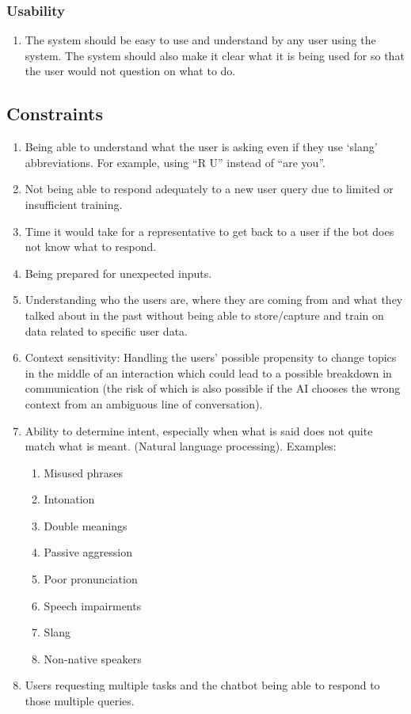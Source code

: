 \documentclass[11pt]{article}
\begin{document}
\subsubsection{Usability}
\begin{enumerate}
	\item The system should be easy to use and understand by any user using the system.  The system should also make it clear what it is being used for so that the user would not question on what to do.
\end{enumerate}

\subsection{Constraints}
\begin{enumerate}
	\item Being able to understand what the user is asking even if they use ‘slang’ abbreviations.  For example, using “R U” instead of “are you”.
	\item Not being able to respond adequately to a new user query due to limited or insufficient  training.
	\item Time it would take for a representative to get back to a user if the bot does not know what to respond.
	\item Being prepared for unexpected inputs.
	\item Understanding who the users are, where they are coming from and what they talked about in the past without being able to store/capture and train on data related to specific user data.
	\item Context sensitivity: Handling the users’ possible propensity to change topics in the middle of an interaction which could lead to a possible breakdown in communication (the risk of which is also possible if the AI chooses the wrong context from an ambiguous line of 	conversation).
	\item Ability to determine intent, especially when what is said does not quite match what is meant. (Natural language processing).  Examples:
	\begin{enumerate}
		\item Misused phrases
		\item Intonation
		\item Double meanings
		\item Passive aggression
		\item Poor pronunciation
		\item Speech impairments
		\item Slang
		\item Non-native speakers
	\end{enumerate}
	\item Users requesting multiple tasks and the chatbot being able to respond to those multiple queries.
\end{enumerate}
\end{document}
